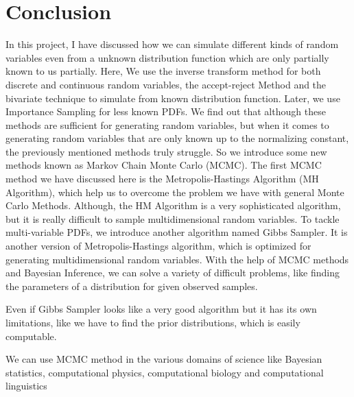 \chapter*{Conclusion}

In this project, I have discussed how we can simulate different kinds of random variables even from a unknown distribution function which are only partially known to us partially.
Here, We use the inverse transform method for both discrete and continuous random variables, the accept-reject Method and the bivariate technique to simulate from known distribution function. Later, we use Importance Sampling for less known PDFs. We find out that although these methods are sufficient for generating random variables,
but when it comes to generating random variables that are only known up to the normalizing constant, the previously mentioned methods truly struggle.
So we introduce some new methods known as Markov Chain Monte Carlo (MCMC).
The first MCMC method we have discussed here is the Metropolis-Hastings Algorithm (MH Algorithm), which help us to overcome the problem we have with general Monte Carlo Methods.
Although, the HM Algorithm is a very sophisticated algorithm, but it is really difficult to sample multidimensional random variables.
To tackle multi-variable PDFs, we introduce another algorithm named Gibbs Sampler.
It is another version of Metropolis-Hastings algorithm, which is optimized for generating multidimensional random variables.
With the help of MCMC methods and Bayesian Inference, we can solve a variety of difficult problems, like finding the parameters of a distribution for given observed samples.

Even if Gibbs Sampler looks like a very good algorithm but it has its own limitations, like we have to find the prior distributions, which is easily computable.

We can use MCMC method in the various domains of science like Bayesian statistics, computational physics, computational biology and computational linguistics
